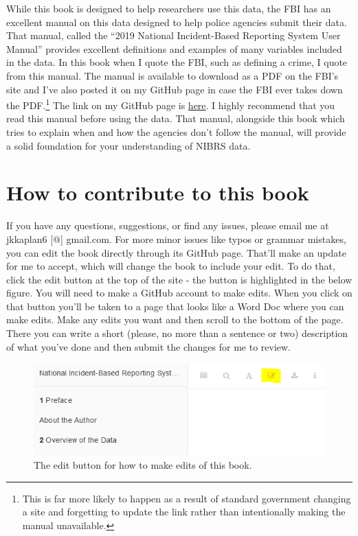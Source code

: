 \documentclass[
  12pt,
  openany]{book}
\begin{document}
While this book is designed to help researchers use this data, the FBI has an excellent manual on this data designed to help police agencies submit their data. That manual, called the ``2019 National Incident-Based Reporting System User Manual'' provides excellent definitions and examples of many variables included in the data. In this book when I quote the FBI, such as defining a crime, I quote from this manual. The manual is available to download as a PDF on the FBI's site and I've also posted it on my GitHub page in case the FBI ever takes down the PDF.\footnote{This is far more likely to happen as a result of standard government changing a site and forgetting to update the link rather than intentionally making the manual unavailable.} The link on my GitHub page is \href{https://github.com/jacobkap/nibrsbook/blob/main/2019-nibrs-user-manual-v-1.0.pdf}{here}. I highly recommend that you read this manual before using the data. That manual, alongside this book which tries to explain when and how the agencies don't follow the manual, will provide a solid foundation for your understanding of NIBRS data.

\hypertarget{how-to-contribute-to-this-book}{%
\section{How to contribute to this book}\label{how-to-contribute-to-this-book}}

If you have any questions, suggestions, or find any issues, please email me at jkkaplan6 {[}@{]} gmail.com. For more minor issues like typos or grammar mistakes, you can edit the book directly through its GitHub page. That'll make an update for me to accept, which will change the book to include your edit. To do that, click the edit button at the top of the site - the button is highlighted in the below figure. You will need to make a GitHub account to make edits. When you click on that button you'll be taken to a page that looks like a Word Doc where you can make edits. Make any edits you want and then scroll to the bottom of the page. There you can write a short (please, no more than a sentence or two) description of what you've done and then submit the changes for me to review.

\begin{figure}

{\centering \includegraphics[width=0.9\linewidth]{images/edit_button} 

}

\caption{The edit button for how to make edits of this book.}\label{fig:unnamed-chunk-2}
\end{figure}
\end{document}
